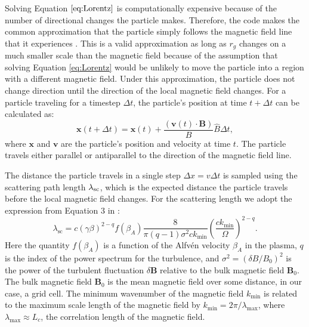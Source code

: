 \documentclass[twocolumn]{aastex63}
\def\lp{\left(}
\def\rp{\right)}
\def\t{\text}
\begin{document}
 Solving Equation $\ref{eq:Lorentz}$ is computationally expensive because of the number of directional changes the particle makes. Therefore, the code makes the common approximation that the particle simply follows the magnetic field line that it experiences \citep{harding_2016_CRs, fitzaxen_2021_CRs}. This is a valid approximation as long as $r_g$ changes on a much smaller scale than the magnetic field because of the assumption that solving Equation \ref{eq:Lorentz} would be unlikely to move the particle into a region with a different magnetic field. Under this approximation, the particle does not change direction until the direction of the local magnetic field changes. For a particle traveling for a timestep $\Delta t$, the particle's position at time $t+\Delta t$ can be calculated as: 
\begin{equation} \label{eq:transpos}
\textbf{x}(t+\Delta t)= \textbf{x}(t)+ \frac{(\textbf{v}(t) \cdot \textbf{B})}{B}\hat{B} \Delta t,
\end{equation}
where $\textbf{x}$ and $\textbf{v}$ are the particle's position and velocity at time $t$. The particle travels either parallel or antiparallel to the direction of the magnetic field line.

The distance the particle travels in a single step $\Delta x=v \Delta t$ is sampled using the scattering path length $\lambda_{\rm sc}$, which is the expected distance the particle travels before the local magnetic field changes. For the scattering length we adopt the expression from Equation 3 in  \cite{fryer_2007_probing}:
\begin{equation}
    \label{eq:lambda_sc}
    \lambda_{\t{sc}}=c(\gamma\beta)^{2-q}f(\beta_A)\frac{8}{\pi(q-1)\sigma^2ck_{\t{min}}}\lp\frac{ ck_{\t{min}}}{\Omega}\rp^{2-q}. 
\end{equation}
Here the quantity $f(\beta_A)$ is a function of the Alfv\'en velocity $\beta_A$ in the plasma, $q$ is the index of the power spectrum for the turbulence, and  $\sigma^2=(\delta B/B_0)^2$ is the power of the turbulent fluctuation $\delta \textbf{B}$ relative to the bulk magnetic field $\textbf{B}_0$. The bulk magnetic field $\textbf{B}_0$ is the mean magnetic field over some distance, in our case, a grid cell. The minimum wavenumber of the magnetic field $k_{\t{min}}$ is related to the maximum scale length of the magnetic field by $k_{\t{min}}=2\pi/\lambda_{\t{max}}$, where $\lambda_{\t{max}} \approx L_c$, the correlation length of the magnetic field.
\end{document}
